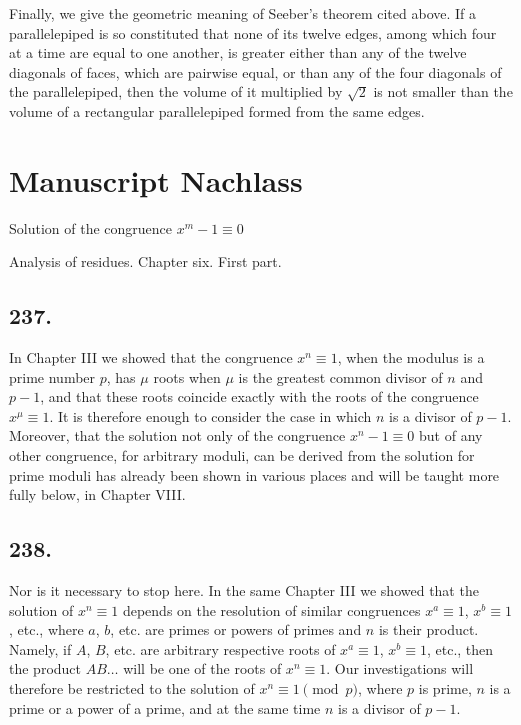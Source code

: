 \documentclass[12pt]{article}
\begin{document}
Finally, we give the geometric meaning of Seeber's theorem cited above. If a parallelepiped is so constituted that none of its twelve edges, among which four at a time are equal to one another, is greater either than any of the twelve diagonals of faces, which are pairwise equal, or than any of the four diagonals of the parallelepiped, then the volume of it multiplied by $\sqrt2$ is not smaller than the volume of a rectangular parallelepiped formed from the same edges.



\clearpage

\section*{Manuscript Nachlass}

\begin{center}
{\large Solution of the congruence $x^m-1 \equiv 0$}\par
{\large Analysis of residues. Chapter six. First part.}
\end{center}

\subsection*{237.}
In Chapter III we showed that the congruence $x^n\equiv 1$, when the modulus is a prime number $p$, has $\mu$ roots when $\mu$ is the greatest common divisor of $n$ and $p-1$, and that these roots coincide exactly with the roots of the congruence $x^\mu\equiv 1$. It is therefore enough to consider the case in which $n$ is a divisor of $p-1$. Moreover, that the solution not only of the congruence $x^n-1\equiv 0$ but of any other congruence, for arbitrary moduli, can be derived from the solution for prime moduli has already been shown in various places and will be taught more fully below, in Chapter VIII.

\subsection*{238.}
Nor is it necessary to stop here. In the same Chapter III we showed that the solution of $x^n\equiv 1$ depends on the resolution of similar congruences $x^a\equiv 1$, $x^b\equiv 1$, etc., where $a$, $b$, etc. are primes or powers of primes and $n$ is their product. Namely, if $A$, $B$, etc. are arbitrary respective roots of $x^a\equiv 1$, $x^b\equiv 1$, etc., then the product $AB\ldots$ will be one of the roots of $x^n\equiv 1$. Our investigations will therefore be restricted to the solution of $x^n\equiv 1\pmod p$, where $p$ is prime, $n$ is a prime or a power of a prime, and at the same time $n$ is a divisor of $p-1$.
\end{document}
